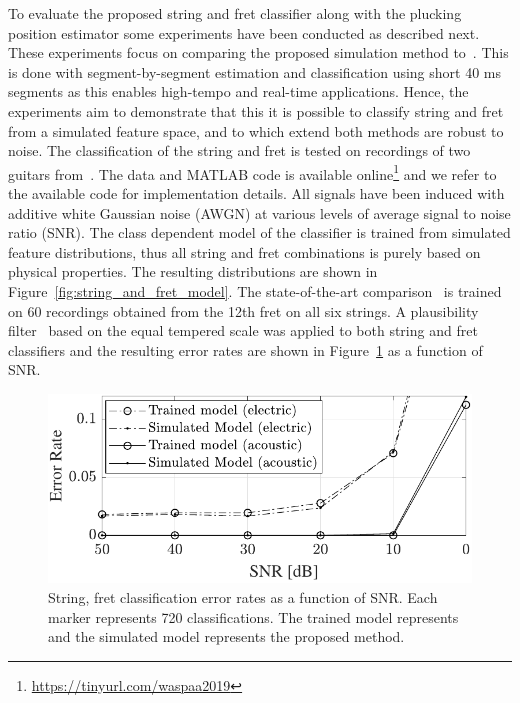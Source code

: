 To evaluate the proposed string and fret classifier along  with the plucking position estimator some experiments have been conducted as described next. These experiments focus on comparing the proposed simulation method to~\cite{hjerrild::icassp19}. This is done with segment-by-segment estimation and classification using short 40 ms segments as this enables high-tempo and real-time applications. Hence, the experiments aim to demonstrate that this it is possible to classify string and fret from a simulated feature space, and to which extend both methods are robust to noise.
The classification of the string and fret is tested on recordings of two guitars from~\cite{hjerrild::icassp19}. The data and MATLAB code is available online\footnote{\url{https://tinyurl.com/waspaa2019}} and we refer to the available code for implementation details. All signals have been induced with additive white Gaussian noise (AWGN) at various levels of average signal to noise ratio (SNR). The class dependent model of the classifier is trained from simulated feature distributions, thus all string and fret combinations is purely based on physical properties. The resulting distributions are shown in Figure~\ref{fig:string_and_fret_model}. The state-of-the-art comparison~\cite{hjerrild::icassp19} is trained on 60 recordings obtained from the 12th fret on all six strings. A plausibility filter~\cite{abesser:automatic_string_detection_ml,hjerrild::icassp19} based on the equal tempered scale was applied to both string and fret classifiers and the resulting error rates are shown in Figure~\ref{fig:string_fret_electric} as a function of SNR. %
%
\begin{figure}[t]
\centering
   \includegraphics[width=.86\linewidth]{img/SNRfig_both.pdf}\vspace{-2mm}
   \caption{String, fret classification error rates as a function of SNR. Each marker represents 720 classifications. The trained model represents~\cite{hjerrild::icassp19} and the simulated model represents the proposed method.}
   \label{fig:string_fret_electric} 
\end{figure}
